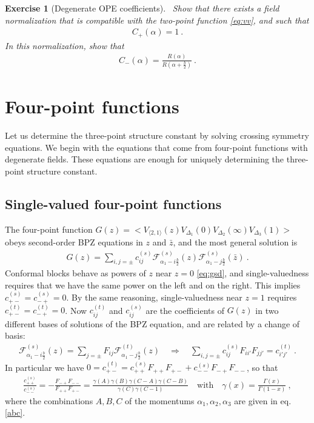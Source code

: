 \documentclass[12pt, a4paper]{article}
\theoremstyle{break}
\newtheorem{exo}{Exercise}[section]
\begin{document}
\begin{exo}[Degenerate OPE coefficients]
 ~\label{exo:doc}
 Show that there exists a field normalization that is compatible with the two-point function \eqref{eq:vv}, and such that
 \begin{align}
  C_+(\alpha) = 1\ .
 \end{align}
 In this normalization, show that 
 \begin{align}
  C_-(\alpha) = \frac{R(\alpha)}{R(\alpha+\frac{b}{2})}\ .
 \end{align}
\end{exo}

\section{Four-point functions}\label{sec:4pt}

Let us determine the three-point structure constant by solving crossing symmetry equations. We begin with the equations that come from four-point functions with degenerate fields. These equations are enough for uniquely determining the three-point structure constant.

\subsection{Single-valued four-point functions}

The four-point function $G(z) = \Big< V_{\langle 2, 1 \rangle}(z) V_{\Delta_1}(0)V_{\Delta_2}(\infty)V_{\Delta_3}(1) \Big>$ obeys second-order BPZ equations in $z$ and $\bar z$, and the most general solution is
\begin{align}
 G(z) = \sum_{i,j=\pm} c^{(s)}_{ij} \mathcal{F}^{(s)}_{\alpha_1-i\frac{b}{2}}(z) \mathcal{F}^{(s)}_{\alpha_1-j\frac{b}{2}}(\bar z)\ .
\end{align}
Conformal blocks behave as powers of $z$ near $z=0$ \eqref{eq:gsd}, and single-valuedness requires that we have the same power on the left and on the right. This implies $c^{(s)}_{+-} = c^{(s)}_{-+}=0$. By the same reasoning, single-valuedness near $z=1$ requires $c^{(t)}_{+-}=c^{(t)}_{-+}=0$. Now $c^{(t)}_{ij}$ and $c^{(s)}_{ij}$ are the coefficients of $G(z)$ in two different bases of solutions of the BPZ equation, and are related by a change of basis:
\begin{align}
 \mathcal{F}^{(s)}_{\alpha_1-i\frac{b}{2}}(z) = \sum_{j=\pm} F_{ij} \mathcal{F}^{(t)}_{\alpha_1-j\frac{b}{2}}(z) \quad \Rightarrow \quad \sum_{i,j=\pm} c^{(s)}_{ij} F_{ii'} F_{jj'} = c^{(t)}_{i'j'}\ .
\end{align}
In particular we have $0 = c^{(t)}_{+-}= c_{++}^{(s)} F_{++}F_{+-} + c_{--}^{(s)} F_{-+}F_{--}$, so that
\begin{align}
 \frac{c_{++}^{(s)}}{c_{--}^{(s)}} = -\frac{F_{-+}F_{--}}{F_{++}F_{+-}} 
 = \frac{\gamma(A)\gamma(B)\gamma(C-A)\gamma(C-B)}{\gamma(C)\gamma(C-1)}\quad \text{with} \quad \gamma(x) =\frac{\Gamma(x)}{\Gamma(1-x)}\ ,
 \label{eq:coc}
\end{align}
where the combinations $A,B,C$ of the momentums $\alpha_1,\alpha_2,\alpha_3$ are given in eq. \eqref{abc}.
\end{document}
